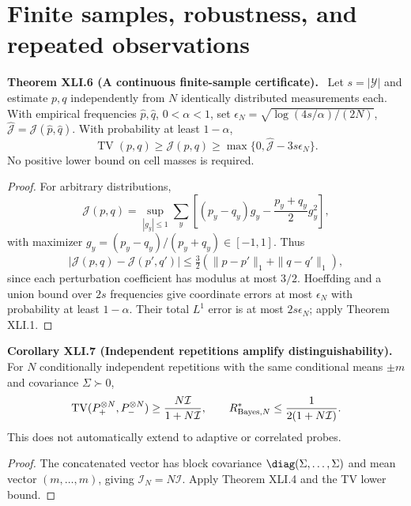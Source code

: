 \documentclass[11pt,a4paper,oneside]{book}
\newcommand{\statement}[3]{\par\medskip\noindent\textbf{#1 #2 (#3).}\ }
\begin{document}
\section{Finite samples, robustness, and repeated observations}
\statement{Theorem}{XLI.6}{A continuous finite-sample certificate}
Let $s=|\mathcal Y|$ and estimate $p,q$ independently from $N$ identically distributed measurements each. With empirical frequencies $\widehat p,\widehat q$, $0<\alpha<1$, set $\epsilon_N=\sqrt{\log(4s/\alpha)/(2N)}$, $\widehat{\mathcal J}=\mathcal J(\widehat p,\widehat q)$. With probability at least $1-\alpha$,
\begin{equation}\operatorname{TV}(p,q)\ge\mathcal J(p,q)\ge\max\{0,\widehat{\mathcal J}-3s\epsilon_N\}.\tag{173}\end{equation}
No positive lower bound on cell masses is required.
\begin{proof}
For arbitrary distributions,
\[\mathcal J(p,q)=\sup_{|g_y|\le1}\sum_y\left[(p_y-q_y)g_y-\frac{p_y+q_y}{2}g_y^2\right],\]
with maximizer $g_y=(p_y-q_y)/(p_y+q_y)\in[-1,1]$. Thus
\[|\mathcal J(p,q)-\mathcal J(p',q')|\le\tfrac32(\|p-p'\|_1+\|q-q'\|_1),\]
since each perturbation coefficient has modulus at most $3/2$. Hoeffding and a union bound over $2s$ frequencies give coordinate errors at most $\epsilon_N$ with probability at least $1-\alpha$. Their total $L^1$ error is at most $2s\epsilon_N$; apply Theorem XLI.1.
\end{proof}
\statement{Corollary}{XLI.7}{Independent repetitions amplify distinguishability}
For $N$ conditionally independent repetitions with the same conditional means $\pm m$ and covariance $\Sigma\succ0$,
\[\operatorname{TV}(P_+^{\otimes N},P_-^{\otimes N})\ge\frac{N\mathcal I}{1+N\mathcal I},\qquad R^*_{{\rm Bayes},N}\le\frac1{2(1+N\mathcal I)}.\]
This does not automatically extend to adaptive or correlated probes.
\begin{proof}
The concatenated vector has block covariance $\diag(\Sigma,\ldots,\Sigma)$ and mean vector $(m,\ldots,m)$, giving $\mathcal I_N=N\mathcal I$. Apply Theorem XLI.4 and the TV lower bound.
\end{proof}
\end{document}
